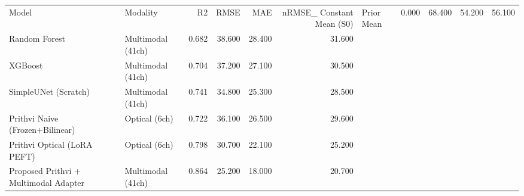 \begin{tabular}{llrrrr}
\toprule
Model & Modality & R2 & RMSE & MAE & nRMSE_%
\midrule
Constant Mean (S0) & Prior Mean & 0.000 & 68.400 & 54.200 & 56.100 \\
Random Forest & Multimodal (41ch) & 0.682 & 38.600 & 28.400 & 31.600 \\
XGBoost & Multimodal (41ch) & 0.704 & 37.200 & 27.100 & 30.500 \\
SimpleUNet (Scratch) & Multimodal (41ch) & 0.741 & 34.800 & 25.300 & 28.500 \\
Prithvi Naive (Frozen+Bilinear) & Optical (6ch) & 0.722 & 36.100 & 26.500 & 29.600 \\
Prithvi Optical (LoRA PEFT) & Optical (6ch) & 0.798 & 30.700 & 22.100 & 25.200 \\
Proposed Prithvi + Multimodal Adapter & Multimodal (41ch) & 0.864 & 25.200 & 18.000 & 20.700 \\
\bottomrule
\end{tabular}
